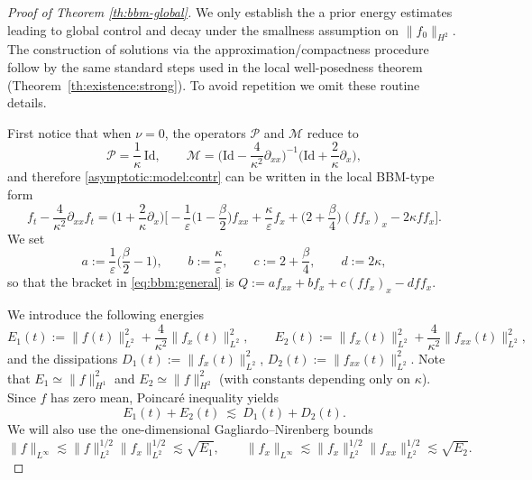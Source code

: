 \documentclass[10pt,a4paper]{amsart}
\begin{document}
\begin{proof}[Proof of Theorem \ref{th:bbm-global}]
	We only establish the a prior energy estimates leading to global control and decay under the smallness
	assumption on $\|f_0\|_{H^2}$. The construction of solutions via the approximation/compactness procedure follow by the same standard steps used in the local well-posedness theorem
	(Theorem~\ref{th:existence:strong}). To avoid repetition we omit these routine details. 
	\medskip
	
	First notice that when $\nu=0$, the operators $\mathcal{P}$ and $\mathcal{M}$ reduce to
	\[
	\mathcal{P}=\frac{1}{\kappa}\,\mathrm{Id},\qquad
	\mathcal{M}=\Big(\mathrm{Id}-\frac{4}{\kappa^2}\partial_{xx}\Big)^{-1}\Big(\mathrm{Id}+\frac{2}{\kappa}\partial_x\Big),
	\]
	and therefore \eqref{asymptotic:model:contr} can be written in the local BBM-type form
	\begin{equation}\label{eq:bbm:general}
		f_t-\frac{4}{\kappa^2}\partial_{xx}f_t
		=\Big(1+\frac{2}{\kappa}\partial_x\Big)\Big[
		-\frac{1}{\varepsilon}\Big(1-\frac{\beta}{2}\Big)f_{xx}
		+\frac{\kappa}{\varepsilon}f_x
		+\Big(2+\frac{\beta}{4}\Big)(ff_x)_x
		-2\kappa ff_x\Big].
	\end{equation}
	We set
	\[
	a:=\frac{1}{\varepsilon}\Big(\frac{\beta}{2}-1\Big),\qquad
	b:=\frac{\kappa}{\varepsilon},\qquad
	c:=2+\frac{\beta}{4},\qquad
	d:=2\kappa,
	\]
	so that the bracket in \eqref{eq:bbm:general} is $Q:=a f_{xx}+b f_x+c(ff_x)_x-dff_x$. \medskip
	
	We introduce the following energies
	\[
	E_1(t):=\|f(t)\|_{L^2}^2+\frac{4}{\kappa^2}\|f_x(t)\|_{L^2}^2,
	\qquad
	E_2(t):=\|f_x(t)\|_{L^2}^2+\frac{4}{\kappa^2}\|f_{xx}(t)\|_{L^2}^2,
	\]
	and the dissipations $D_1(t):=\|f_x(t)\|_{L^2}^2$, $D_2(t):=\|f_{xx}(t)\|_{L^2}^2$. Note that $E_1\simeq\|f\|_{H^1}^2$ and
	$E_2\simeq\|f\|_{H^2}^2$ (with constants depending only on $\kappa$). Since $f$ has zero mean, Poincar\'e inequality yields
	\begin{equation}\label{eq:coercive-bbm}
		E_1(t)+E_2(t)\ \lesssim\ D_1(t)+D_2(t).
	\end{equation}
	We will also use the one-dimensional Gagliardo--Nirenberg bounds
	\begin{equation}\label{eq:GN-BBM}
		\|f\|_{L^\infty}\lesssim \|f\|_{L^2}^{1/2}\|f_x\|_{L^2}^{1/2}\lesssim \sqrt{E_1},
		\qquad
		\|f_x\|_{L^\infty}\lesssim \|f_x\|_{L^2}^{1/2}\|f_{xx}\|_{L^2}^{1/2}\lesssim \sqrt{E_2}.
	\end{equation}
	

\end{proof}
\end{document}

